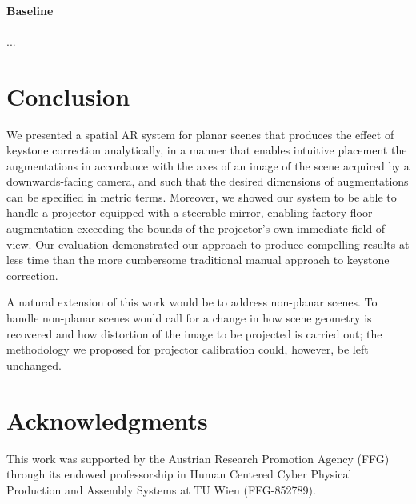 \documentclass[review]{elsarticle}
\begin{document}
\paragraph{Baseline} ...

\section{Conclusion}

We presented a spatial AR system for planar scenes that produces the effect of keystone correction analytically, in a manner that enables intuitive placement the augmentations in accordance with the axes of an image of the scene acquired by a downwards-facing camera, and such that the desired dimensions of augmentations can be specified in metric terms. Moreover, we showed our system to be able to handle a projector equipped with a steerable mirror, enabling factory floor augmentation exceeding the bounds of the projector's own immediate field of view. Our evaluation demonstrated our approach to produce compelling results at less time than the more cumbersome traditional manual approach to keystone correction.

A natural extension of this work would be to address non-planar scenes. To handle non-planar scenes would call for a change in how scene geometry is recovered and how distortion of the image to be projected is carried out; the methodology we proposed for projector calibration could, however, be left unchanged.

\section{Acknowledgments}

This work was supported by the Austrian Research Promotion Agency (FFG) through its endowed professorship in Human Centered Cyber Physical Production and Assembly Systems at TU Wien (FFG-852789).


\end{document}
